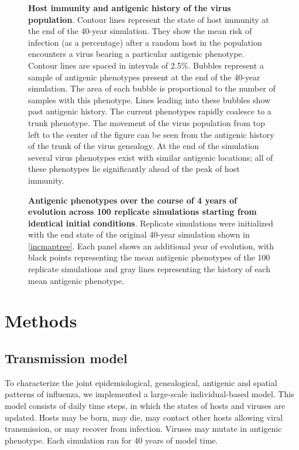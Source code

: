 \begin{figure}[H]
	\centering
	\caption{\textbf{Host immunity and antigenic history of the virus population}.  Contour lines represent the state of host immunity at the end of the 40-year simulation.  They show the mean risk of infection (as a percentage) after a random host in the population encounters a virus bearing a particular antigenic phenotype.  Contour lines are spaced in intervals of 2.5\%. Bubbles represent a sample of antigenic phenotypes present at the end of the 40-year simulation.  The area of each bubble is proportional to the number of samples with this phenotype.  Lines leading into these bubbles show past antigenic history.  The current phenotypes rapidly coalesce to a trunk phenotype.  The movement of the virus population from top left to the center of the figure can be seen from the antigenic history of the trunk of the virus genealogy. At the end of the simulation several virus phenotypes exist with similar antigenic locations; all of these phenotypes lie significantly ahead of the peak of host immunity.}
	\label{immunity}
\end{figure}

\begin{figure}[H]
	\centering
	\caption{\textbf{Antigenic phenotypes over the course of 4 years of evolution across 100 replicate simulations starting from identical initial conditions}.  Replicate simulations were initialized with the end state of the original 40-year simulation shown in \ref{incmaptree}.  Each panel shows an additional year of evolution, with black points representing the mean antigenic phenotypes of the 100 replicate simulations and gray lines representing the history of each mean antigenic phenotype.}
	\label{replicateevol}
\end{figure}

\section*{Methods}

\subsection*{Transmission model}

To characterize the joint epidemiological, genealogical, antigenic and spatial patterns of influenza, we implemented a large-scale individual-based model.  This model consists of daily time steps, in which the states of hosts and viruses are updated.  Hosts may be born, may die, may contact other hosts allowing viral transmission, or may recover from infection.  Viruses may mutate in antigenic phenotype.  Each simulation ran for 40 years of model time.  

